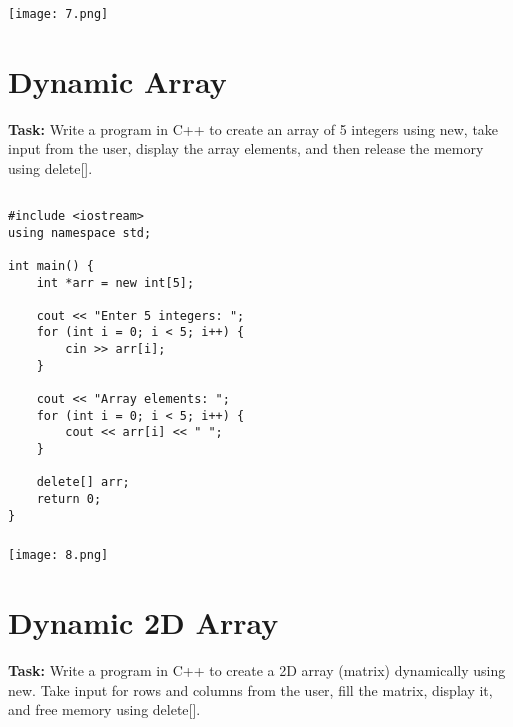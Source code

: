 \documentclass[12pt,a4paper]{article}
\begin{document}
\subsubsection{}
\begin{center}
    \texttt{[image: 7.png]}
\end{center}


\section{Dynamic Array }
\textbf{Task:} Write a program in C++ to create an array of 5 integers using new, take input from the user, display the array elements, and then release the memory using delete[].

\subsection{}
\begin{lstlisting}
#include <iostream>
using namespace std;

int main() {
    int *arr = new int[5];

    cout << "Enter 5 integers: ";
    for (int i = 0; i < 5; i++) {
        cin >> arr[i];
    }

    cout << "Array elements: ";
    for (int i = 0; i < 5; i++) {
        cout << arr[i] << " ";
    }

    delete[] arr;
    return 0;
}

\end{lstlisting}

\subsubsection{}
\begin{center}
    \texttt{[image: 8.png]}
\end{center}


\section{Dynamic 2D Array }
\textbf{Task:} Write a program in C++ to create a 2D array (matrix) dynamically using new. Take input for rows and columns from the user, fill the matrix, display it, and free memory using delete[].
\end{document}
